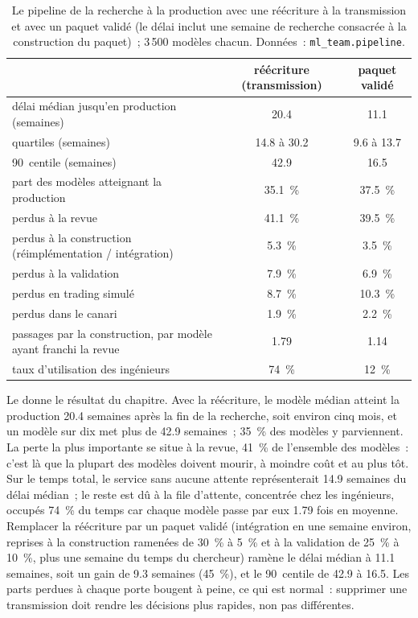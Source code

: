 \begin{table}[htbp]
\centering\small
\begin{tabular}{@{}lcc@{}}
\toprule
 & réécriture (transmission) & paquet validé\\
\midrule
délai médian jusqu'en production (semaines) & 20.4 & 11.1\\
quartiles (semaines) & 14.8 à 30.2 & 9.6 à 13.7\\
90\up{e}~centile (semaines) & 42.9 & 16.5\\
part des modèles atteignant la production & 35.1~\% & 37.5~\%\\
perdus à la revue & 41.1~\% & 39.5~\%\\
perdus à la construction (réimplémentation / intégration) & 5.3~\% & 3.5~\%\\
perdus à la validation & 7.9~\% & 6.9~\%\\
perdus en trading simulé & 8.7~\% & 10.3~\%\\
perdus dans le canari & 1.9~\% & 2.2~\%\\
passages par la construction, par modèle ayant franchi la revue & 1.79 & 1.14\\
taux d'utilisation des ingénieurs & 74~\% & 12~\%\\
\bottomrule
\end{tabular}
\caption{Le pipeline de la recherche à la production avec une réécriture à la transmission et avec un paquet validé (le délai inclut une
semaine de recherche consacrée à la construction du paquet)~; 3\,500 modèles chacun. Données~: \texttt{ml\_team.pipeline}.}\label{tab:ml:team:pipeline}
\end{table}

Le  donne le résultat du chapitre. Avec la réécriture, le modèle médian atteint la production 20.4 semaines après
la fin de la recherche, soit environ cinq mois, et un modèle sur dix met plus de 42.9 semaines~; 35~\% des modèles y parviennent. La perte la plus importante se situe à la
revue, 41~\% de l'ensemble des modèles~: c'est là que la plupart des modèles doivent mourir, à moindre coût et au plus tôt. Sur le temps total, le service sans aucune attente
représenterait 14.9 semaines du délai médian~; le reste est dû à la file d'attente, concentrée chez les ingénieurs, occupés 74~\% du temps
car chaque modèle passe par eux 1.79 fois en moyenne. Remplacer la réécriture par un paquet validé (intégration en une semaine environ,
reprises à la construction ramenées de 30~\% à 5~\% et à la validation de 25~\% à 10~\%, plus une semaine du temps du chercheur)
ramène le délai médian à 11.1 semaines, soit un gain de 9.3 semaines (45~\%), et le 90~centile de 42.9 à 16.5. Les parts perdues à chaque
porte bougent à peine, ce qui est normal~: supprimer une transmission doit rendre les décisions plus rapides, non pas différentes.

